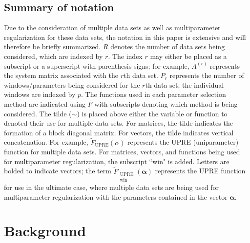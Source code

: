 \documentclass[12pt]{article}
\newcommand{\regparam}{\alpha}  %
\newcommand{\regparamVec}{\bm{\regparam}}   %
\newcommand{\UBig}{\widetilde{F}_{\text{UPRE}}}	%
\newcommand{\UWinBig}{\widetilde{F}_{\substack{\text{UPRE} \\ \text{win}}}}	%
\begin{document}
\subsection{Summary of notation} \label{sec:Notation}
Due to the consideration of multiple data sets as well as multiparameter regularization for these data sets, the notation in this paper is extensive and will therefore be briefly summarized. $R$ denotes the number of data sets being considered, which are indexed by $r$. The index $r$ may either be placed as a subscript or a superscript with parenthesis signs; for example, $A^{(r)}$ represents the system matrix associated with the $r$th data set. $P_r$ represents the number of windows/parameters being considered for the $r$th data set; the individual windows are indexed by $p$. The functions used in each parameter selection method are indicated using $F$ with subscripts denoting which method is being considered. The tilde ($\sim$) is placed above either the variable or function to denoted their use for multiple data sets. For matrices, the tilde indicates the formation of a block diagonal matrix. For vectors, the tilde indicates vertical concatenation. For example, $\UBig(\regparam)$ represents the UPRE (uniparameter) function for multiple data sets. For matrices, vectors, and functions being used for multiparameter regularization, the subscript ``win" is added. Letters are bolded to indicate vectors; the term $\UWinBig(\regparamVec)$ represents the UPRE function for use in the ultimate case, where multiple data sets are being used for multiparameter regularization with the parameters contained in the vector $\regparamVec$.

\section{Background} \label{sec:Background}
\end{document}
